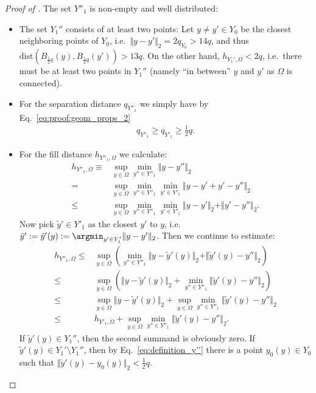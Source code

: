 \documentclass[a4paper, 10pt]{article}
\begin{document}
\begin{proof}[Proof of ]
The set $Y''_1$ is non-empty and well distributed:
%
\begin{itemize}
\item The set $Y_1''$ consists of at least two points:
Let $y \neq y' \in Y_0$ be the closest neighboring points of $Y_0$, i.e.\ $\Vert y - y' \Vert_2 = 2q_{Y_0} > 14q$, 
and thus $\mathrm{dist}(B_{\frac{1}{2}q}(y), B_{\frac{1}{2}q}(y')) > 13q$.
On the other hand, $h_{Y_1', \Omega} < 2q$, i.e.\ there must be at least two points in $Y_1''$ (namely ``in between'' $y$ and $y'$ as $\Omega$ is connected).
%
\item For the separation distance $q_{Y''_1}$ we simply have by Eq.~\eqref{eq:proof:geom_props_2}
\begin{align*}
q_{Y''_1} \geq q_{Y'_1} \geq \frac{1}{2} q.
\end{align*}
\item For the fill distance $h_{Y''_1, \Omega}$ we calculate:
\begin{align*}
h_{Y''_1, \Omega} \equiv& \sup_{y \in \Omega} \min_{y'' \in Y''_1} \Vert y - y'' \Vert_2 \\
=& \sup_{y \in \Omega} \min_{y'' \in Y''_1} \min_{y' \in Y'_1} \Vert y - y' + y' - y'' \Vert_2 \\
\leq& \sup_{y \in \Omega} \min_{y'' \in Y''_1} \min_{y' \in Y'_1} \Vert y - y' \Vert_2 + \Vert y' - y'' \Vert_2.
\end{align*}
Now pick $\tilde{y}' \in Y'_1$ as the closest $y'$ to $y$, i.e.\ $\tilde{y}' := \tilde{y}'(y) := \argmin_{y' \in Y'_1} \Vert y - y' \Vert_2$.
Then we continue to estimate:
\begin{align*}
h_{Y''_1, \Omega} \leq& \sup_{y \in \Omega} \left( \min_{y'' \in Y''_1} \Vert y - \tilde{y}'(y) \Vert_2 + \Vert \tilde{y}'(y) - y'' \Vert_2 \right) \\
\leq& \sup_{y \in \Omega} \left( \Vert y - \tilde{y}'(y) \Vert_2 + \min_{y'' \in Y''_1}  \Vert \tilde{y}'(y) - y'' \Vert_2 \right) \\
\leq& \sup_{y \in \Omega} \Vert y - \tilde{y}'(y) \Vert_2 + \sup_{y \in \Omega} \min_{y'' \in Y''_1}  \Vert \tilde{y}'(y) - y'' \Vert_2 \\
\leq& h_{Y'_1, \Omega} + \sup_{y \in \Omega} \min_{y'' \in Y''_1}  \Vert \tilde{y}'(y) - y'' \Vert_2.
%
%
%
%
%
%
\end{align*}
If $\tilde{y}'(y) \in Y_1''$, then the second summand is obviously zero.
If $\tilde{y}'(y) \in Y_1' \setminus Y_1''$, then by Eq.\ \eqref{eq:definition_y''} there is a point $y_0(y) \in Y_0$ such that $\Vert \tilde{y}'(y) - y_0(y) \Vert_2 < \frac{1}{2} q$. 

\end{itemize}
\end{proof}
\end{document}
